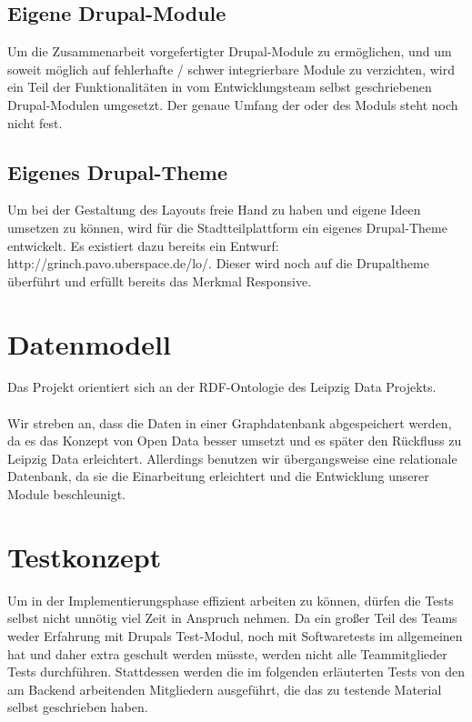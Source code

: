 \documentclass{swp}
\begin{document}
\subsection{Eigene Drupal-Module}
Um die Zusammenarbeit vorgefertigter Drupal-Module zu erm\"oglichen, und um soweit m\"oglich auf fehlerhafte / schwer integrierbare Module zu verzichten, wird ein Teil der Funktionalit\"aten in vom Entwicklungsteam selbst geschriebenen Drupal-Modulen umgesetzt. Der genaue Umfang der oder des Moduls steht noch nicht fest.
\subsection{Eigenes Drupal-Theme}
Um bei der Gestaltung des Layouts freie Hand zu haben und eigene Ideen umsetzen zu k\"onnen, wird f\"ur die Stadtteilplattform ein eigenes Drupal-Theme entwickelt. Es existiert dazu bereits ein Entwurf: http://grinch.pavo.uberspace.de/lo/. Dieser wird noch auf die Drupaltheme \"uberf\"uhrt und erf\"ullt bereits das Merkmal \glqq Responsive\grqq{}.
\section{Datenmodell}
Das Projekt orientiert sich an der RDF-Ontologie des Leipzig Data Projekts.\\\\
Wir streben an, dass die Daten in einer Graphdatenbank abgespeichert werden, da es das Konzept von Open Data besser umsetzt und es sp\"ater den R\"uckfluss zu Leipzig Data erleichtert. Allerdings benutzen wir \"ubergangsweise eine relationale Datenbank, da sie die Einarbeitung erleichtert und die Entwicklung unserer Module beschleunigt.
\section{Testkonzept}
Um in der Implementierungsphase effizient arbeiten zu k\"onnen, d\"urfen die Tests selbst nicht unn\"otig viel Zeit in Anspruch nehmen. Da ein gro{\ss}er Teil des Teams weder Erfahrung mit Drupals Test-Modul, noch mit Softwaretests im allgemeinen hat und daher extra geschult werden m\"usste, werden nicht alle Teammitglieder Tests durchf\"uhren. Stattdessen werden die im folgenden erl\"auterten Tests von den am Backend arbeitenden Mitgliedern ausgef\"uhrt, die das zu testende Material selbst geschrieben haben.
\end{document}
